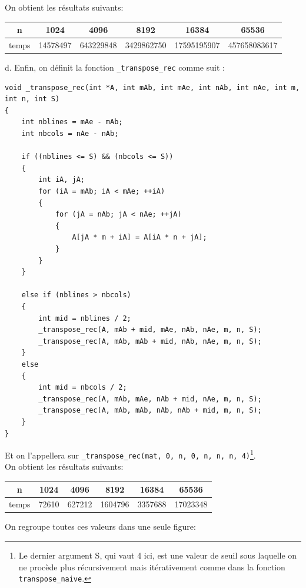 \documentclass[11pt, a4 paper]{article}
\begin{document}
On obtient les résultats suivants:
\begin{center}
    \begin{tabular}{| c | c | c | c | c | c |}
        \hline
    n & 1024 & 4096 & 8192 & 16384 & 65536 \\
    \hline
    temps & 14578497 & 643229848 & 3429862750 & 17595195907 & 457658083617\\
    \hline
    \end{tabular}
\end{center}

d. Enfin, on définit la fonction \texttt{\_transpose\_rec} comme suit :
\begin{lstlisting}[style=CStyle]
void _transpose_rec(int *A, int mAb, int mAe, int nAb, int nAe, int m, int n, int S)
{
    int nblines = mAe - mAb;
    int nbcols = nAe - nAb;

    if ((nblines <= S) && (nbcols <= S))
    {
        int iA, jA;
        for (iA = mAb; iA < mAe; ++iA)
        {
            for (jA = nAb; jA < nAe; ++jA)
            {
                A[jA * m + iA] = A[iA * n + jA];
            }
        }
    }

    else if (nblines > nbcols)
    {
        int mid = nblines / 2;
        _transpose_rec(A, mAb + mid, mAe, nAb, nAe, m, n, S);
        _transpose_rec(A, mAb, mAb + mid, nAb, nAe, m, n, S);
    }
    else
    {
        int mid = nbcols / 2;
        _transpose_rec(A, mAb, mAe, nAb + mid, nAe, m, n, S);
        _transpose_rec(A, mAb, mAb, nAb, nAb + mid, m, n, S);
    }
}
\end{lstlisting}
Et on l'appellera sur \texttt{\_transpose\_rec(mat, 0, n, 0, n, n, n, 4)}\footnote{Le dernier argument S, qui vaut 4 ici, est une valeur de seuil sous laquelle on ne procède plus récursivement mais itérativement comme dans la fonction \texttt{transpose\_naive}.}.\\
On obtient les résultats suivants:
\begin{center}
    \begin{tabular}{| c | c | c | c | c | c |}
        \hline
    n & 1024 & 4096 & 8192 & 16384 & 65536 \\
    \hline
    temps & 72610 & 627212 & 1604796 & 3357688 & 17023348\\
    \hline
    \end{tabular}
\end{center}
On regroupe toutes ces valeurs dans une seule figure:
\end{document}

